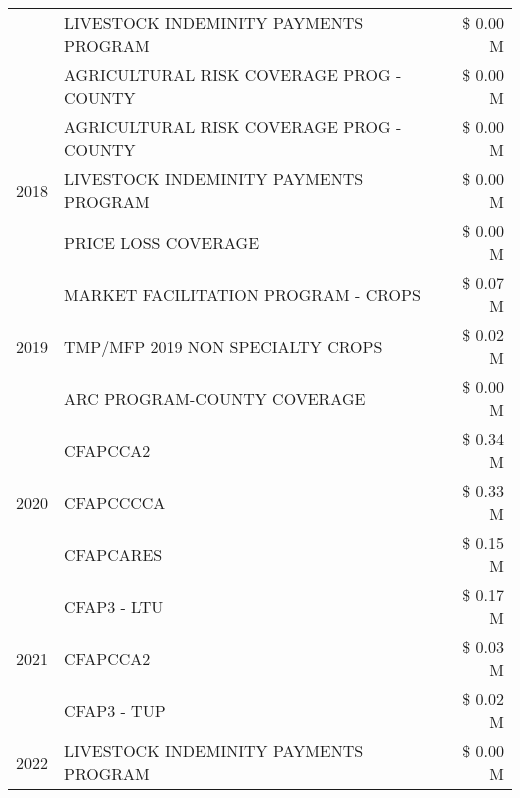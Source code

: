 \begin{tabular}{llr}
 & LIVESTOCK INDEMINITY PAYMENTS PROGRAM & \$ 0.00 M \\
 & AGRICULTURAL RISK COVERAGE PROG - COUNTY & \$ 0.00 M \\
\cline{1-3}
\multirow[t]{3}{*}{2018} & AGRICULTURAL RISK COVERAGE PROG - COUNTY & \$ 0.00 M \\
 & LIVESTOCK INDEMINITY PAYMENTS PROGRAM & \$ 0.00 M \\
 & PRICE LOSS COVERAGE & \$ 0.00 M \\
\cline{1-3}
\multirow[t]{3}{*}{2019} & MARKET FACILITATION PROGRAM - CROPS & \$ 0.07 M \\
 & TMP/MFP 2019 NON SPECIALTY CROPS & \$ 0.02 M \\
 & ARC PROGRAM-COUNTY COVERAGE & \$ 0.00 M \\
\cline{1-3}
\multirow[t]{3}{*}{2020} & CFAPCCA2 & \$ 0.34 M \\
 & CFAPCCCCA & \$ 0.33 M \\
 & CFAPCARES & \$ 0.15 M \\
\cline{1-3}
\multirow[t]{3}{*}{2021} & CFAP3 - LTU & \$ 0.17 M \\
 & CFAPCCA2 & \$ 0.03 M \\
 & CFAP3 - TUP & \$ 0.02 M \\
\cline{1-3}
2022 & LIVESTOCK INDEMINITY PAYMENTS PROGRAM & \$ 0.00 M \\
\cline{1-3}
\bottomrule
\end{tabular}
